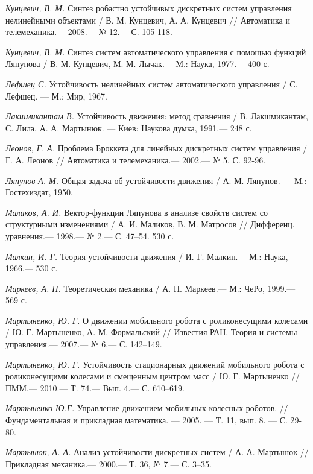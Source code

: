 \begin{thebibliography}{10}
	{\it Кунцевич, В. М.} Синтез робастно устойчивых дискретных систем управления нелинейными объектами
	/ В. М. Кунцевич, А. А. Кунцевич // Автоматика и телемеханика.— 2008.— № 12.— С. 105-118.
	
	{\it Кунцевич, В. М.} Синтез систем автоматического управления с помощью функций
	Ляпунова / В. М. Кунцевич, М. М. Лычак.— М.: Наука, 1977.— 400 с.
	
	{\it Лефшец С.} Устойчивость нелинейных систем автоматического управления /
	С. Лефшец. — М.: Мир, 1967.
	
	{\it Лакшмикантам В.} Устойчивость движения: метод сравнения / В. Лакшмикантам, С. Лила, А. А. Мартынюк. — Киев: Наукова думка, 1991.— 248 с.
	
	{\it Леонов, Г. А.} Проблема Броккета для линейных дискретных систем управления / Г. А. Леонов // Автоматика и телемеханика.—  2002.— № 5. С. 92-96.
	
	{\it Ляпунов А. М.} Общая задача об устойчивости движения /
	А. М. Ляпунов. — М.: Гостехиздат, 1950.
	
	{\it Маликов, А. И.} Вектор-функции Ляпунова в анализе свойств систем со структурными изменениями / А. И. Маликов, В. М. Матросов // Дифференц. уравнения.— 1998.— № 2.— С. 47–54.
	530 с.
	
	{\it Малкин, И. Г.} Теория устойчивости движения / И. Г. Малкин.— М.: Наука, 1966.—
	530 с.
	
	{\it Маркеев, А. П.} Теоретическая механика / А. П. Маркеев.— М.: ЧеРо, 1999.— 569 с.
	
	{\it Мартыненко, Ю. Г.} О движении мобильного робота с роликонесущими колесами / Ю. Г. Мартыненко, А. М. Формальский  //
	Известия РАН. Теория и системы управления.— 2007.— № 6.— С. 142–149.
	
	
	{\it Мартыненко, Ю. Г.} Устойчивость стационарных движений мобильного робота с роликонесущими колесами и смещенным центром масс / Ю. Г. Мартыненко //
	ПММ.— 2010.— Т. 74.— Вып. 4.— С. 610–619.
	
	{\it Мартыненко Ю.Г.} Управление движением мобильных колесных роботов. // Фундаментальная и прикладная математика. — 2005. — Т. 11, вып. 8. — С. 29-80.
	
	
	{\it Мартынюк, А. А.} Анализ устойчивости дискретных систем / А. А. Мартынюк
	// Прикладная механика.— 2000.— Т. 36, № 7.— С. 3–35.
	

\end{thebibliography}
